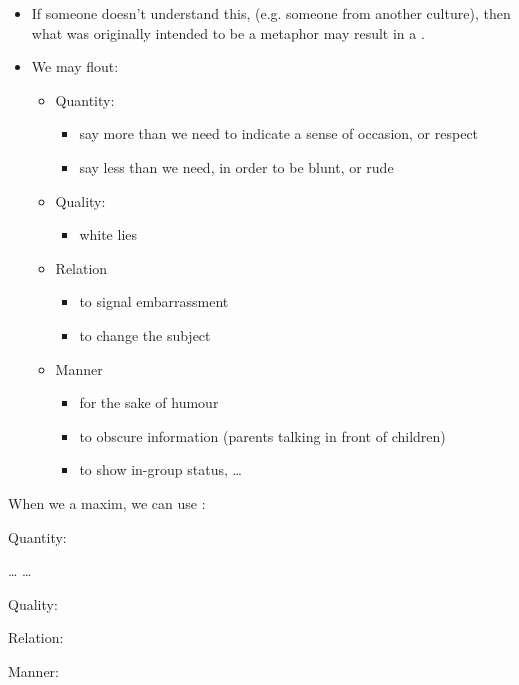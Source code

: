 \documentclass[a4paper,landscape,headrule,footrule,xetex]{foils}
\begin{document}
\begin{itemize}
\item If someone doesn't understand this, (e.g. someone from another
  culture), then what was originally intended to be a metaphor may
  result in a .
\item We may flout: 
  \begin{itemize}
\item Quantity: 
  \begin{itemize}
  \item say  more than we need to indicate a sense of occasion, or respect
  \item  say less than we need, in order to be blunt, or rude
  \end{itemize}
\item Quality: 
  \begin{itemize}
  \item white lies
  \end{itemize}
\item Relation  
  \begin{itemize}
  \item to signal embarrassment
  \item to change the subject
  \end{itemize}
\item Manner
  \begin{itemize}
  \item for the   sake of humour
  \item to obscure information (parents talking in front of children)
  \item to show in-group status,  \ldots
  \end{itemize}
\end{itemize}
\end{itemize}



When we   a maxim, we can use :

\begin{exe}
\ex Quantity:
    \begin{xlist}
    \ex {} \ldots
    \ex {} \ldots
  \end{xlist}
\ex Quality:
  \begin{xlist}
    \ex {}\hfill {}
    \ex {}
  \end{xlist}
\ex Relation:
    \begin{xlist}
    \ex {}
  \end{xlist}

\ex Manner:
 \begin{xlist}
    \ex {}
  \end{xlist}
\end{exe}
\end{document}

